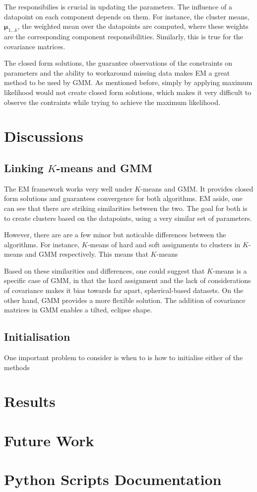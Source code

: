 \documentclass[11pt,openright,a4paper]{article}
\numberwithin{equation}{section}
\begin{document}
The responsibilies is crucial in updating the parameters. The influence of a datapoint on each component depends on them. For instance, the cluster means, $\boldsymbol\mu_{1...k}$, the weighted mean over the datapoints are computed, where these weights are the corresponding component responsibilities. Similarly, this is true for the covariance matrices.

The closed form solutions, the guarantee observations of the constraints on parameters and the ability to workaround missing data makes EM a great method to be used by GMM. As mentioned before, simply by applying maximum likelihood would not create closed form solutions, which makes it very difficult to observe the contraints while trying to achieve the maximum likelihood.

\newpage
\section{Discussions} \label{sec:dis}
\subsection{Linking $K$-means and GMM} \label{ssec:dis-link}
The EM framework works very well under $K$-means and GMM. It provides closed form solutions and guarantees convergence for both algorithms. EM aside, one can see that there are striking similarities between the two. The goal for both is to create clusters based on the datapoints, using a very similar set of parameters.

However, there are are a few minor but noticable differences between the algorithms. For instance, $K$-means of hard and soft assignments to clusters in $K$-means and GMM respectively. This means that $K$-means 

Based on these similarities and differences, one could suggest that $K$-means is a specific case of GMM, in that the hard assignment and the lack of considerations of covariance makes it bias towards far apart, spherical-based datasets. On the other hand, GMM provides a more flexible solution. The addition of covariance matrices in GMM enables a tilted, eclipse shape.

\subsection{Initialisation} \label{ssec:dis-init}
One important problem to consider is when to is how to initialise either of the methods

\subsection{}



\section{Results}

\section{Future Work}

\section{Python Scripts Documentation}

\printbibliography
\end{document}
